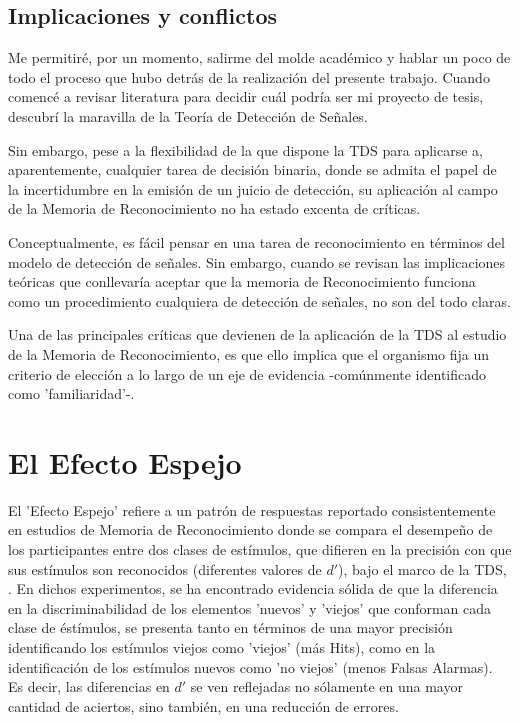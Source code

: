 \subsection{Implicaciones y conflictos}



Me permitiré, por un momento, salirme del molde académico y hablar un poco de todo el proceso que hubo detrás de la realización del presente trabajo. Cuando comencé a revisar literatura para decidir cuál podría ser mi proyecto de tesis, descubrí la maravilla de la Teoría de Detección de Señales. 

Sin embargo, pese a la flexibilidad de la que dispone la TDS para aplicarse a, aparentemente, cualquier tarea de decisión binaria, donde se admita el papel de la incertidumbre en la emisión de un juicio de detección, su aplicación al campo de la Memoria de Reconocimiento no ha estado excenta de críticas.

Conceptualmente, es fácil pensar en una tarea de reconocimiento en términos del modelo de detección de señales. Sin embargo, cuando se revisan las implicaciones teóricas que conllevaría aceptar que la memoria de Reconocimiento funciona como un procedimiento cualquiera de detección de señales, no son del todo claras. 

Una de las principales críticas que devienen de la aplicación de la TDS al estudio de la Memoria de Reconocimiento, es que ello implica que el organismo fija un criterio de elección a lo largo de un eje de evidencia -comúnmente identificado como 'familiaridad'-.   \parencite{Brown1977}

























\section{El Efecto Espejo}

El 'Efecto Espejo' refiere a un patrón de respuestas reportado consistentemente en estudios de Memoria de Reconocimiento donde se compara el desempeño de los participantes entre dos clases de estímulos, que difieren en la precisión con que sus estímulos son reconocidos (diferentes valores de $d'$), bajo el marco de la TDS, \parencite{Glanzer1993}. En dichos experimentos, se ha encontrado evidencia sólida de que la diferencia en la discriminabilidad de los elementos 'nuevos' y 'viejos' que conforman cada clase de éstímulos, se presenta tanto en términos de una mayor precisión identificando los estímulos viejos como 'viejos' (más Hits), como en la identificación de los estímulos nuevos como 'no viejos' (menos Falsas Alarmas). Es decir, las diferencias en $d'$ se ven reflejadas no sólamente en una mayor cantidad de aciertos, sino también, en una reducción de errores.\\

